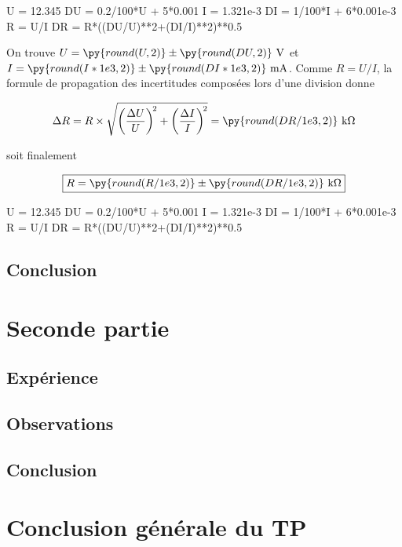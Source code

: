 \documentclass[12pt,a4paper]{article}
\newenvironment{code}{%
\begin{mdframed}[linecolor=Green,innerrightmargin=30pt,innerleftmargin=30pt,
backgroundcolor=Black!5,
skipabove=10pt,skipbelow=10pt,roundcorner=5pt,
splitbottomskip=6pt,splittopskip=12pt]
}{%
\end{mdframed}
}
\newcommand{\U}[1]{~\mathrm{#1}}
\begin{document}
\begin{pycode}
U  = 12.345
DU = 0.2/100*U + 5*0.001
I  = 1.321e-3
DI = 1/100*I + 6*0.001e-3
R  = U/I
DR = R*((DU/U)**2+(DI/I)**2)**0.5
\end{pycode}

On trouve $U=\py{round(U,2)}\pm\py{round(DU,2)}\U{V}$ et $I=\py{round(I*1e3,2)}\pm\py{round(DI*1e3,2)}\U{mA}$. Comme $R=U/I$, la formule de propagation des incertitudes composées lors d'une division donne

$$\Delta R = R\times\sqrt{\left(\frac{\Delta U}{U}\right)^{\!2} + \left(\frac{\Delta I}{I}\right)^{\!2}} = \py{round(DR/1e3,2)}\U{k\Omega}$$

\noindent
soit finalement

$$\boxed{R = \py{round(R/1e3,2)}\pm\py{round(DR/1e3,2)}\U{k\Omega}}$$


\begin{code}
\begin{pyblock}[][numbers=left]
U  = 12.345
DU = 0.2/100*U + 5*0.001
I  = 1.321e-3
DI = 1/100*I + 6*0.001e-3
R  = U/I
DR = R*((DU/U)**2+(DI/I)**2)**0.5
\end{pyblock}
\end{code}

\subsection{Conclusion}

\section{Seconde partie}

\subsection{Expérience}

\subsection{Observations}

\subsection{Conclusion}

\section{Conclusion générale du TP}
\end{document}
